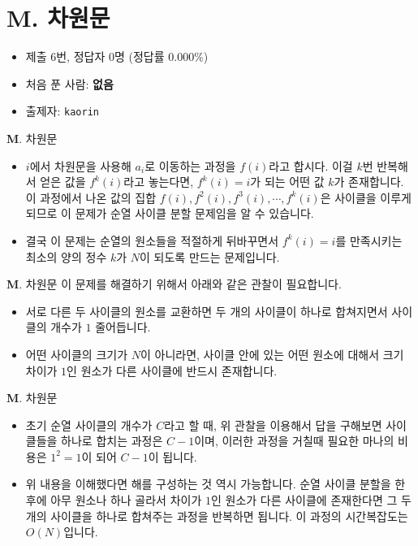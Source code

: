 \section{M. 차원문}

\begin{frame} %
    \begin{itemize}
        \item 제출 6번, 정답자 0명 (정답률 0.000\%)
        \item 처음 푼 사람: \textbf{없음}
        \item 출제자: \texttt{kaorin}
    \end{itemize}
\end{frame}

\begin{frame}{\textbf{M}. 차원문}
    \begin{itemize}
        \item $i$에서 차원문을 사용해 $a_i$로 이동하는 과정을 $f(i)$라고 합시다. 이걸 $k$번 반복해서 얻은 값을 $f^k(i)$라고 놓는다면, $f^k(i)=i$가 되는 어떤 값 $k$가 존재합니다. 이 과정에서 나온 값의 집합 $f(i),f^2(i),f^3(i),\cdots,f^k(i)$은 사이클을 이루게 되므로 이 문제가 순열 사이클 분할 문제임을 알 수 있습니다.
        \item 결국 이 문제는 순열의 원소들을 적절하게 뒤바꾸면서 $f^k(i)=i$를 만족시키는 최소의 양의 정수 $k$가 $N$이 되도록 만드는 문제입니다.  
    \end{itemize}
\end{frame}

\begin{frame}{\textbf{M}. 차원문}
    이 문제를 해결하기 위해서 아래와 같은 관찰이 필요합니다.
    \vspace{16pt}
    \begin{itemize}
        \item 서로 다른 두 사이클의 원소를 교환하면 두 개의 사이클이 하나로 합쳐지면서 사이클의 개수가 $1$ 줄어듭니다.
        \item 어떤 사이클의 크기가 $N$이 아니라면, 사이클 안에 있는 어떤 원소에 대해서 크기 차이가 $1$인 원소가 다른 사이클에 반드시 존재합니다.
    \end{itemize}
\end{frame}

\begin{frame}{\textbf{M}. 차원문}
    \begin{itemize}
        \item 초기 순열 사이클의 개수가 $C$라고 할 때, 위 관찰을 이용해서 답을 구해보면 사이클들을 하나로 합치는 과정은 $C-1$이며, 이러한 과정을 거칠때 필요한 마나의 비용은 $1^2=1$이 되어 $C-1$이 됩니다.
        \item 위 내용을 이해했다면 해를 구성하는 것 역시 가능합니다. 순열 사이클 분할을 한 후에 아무 원소나 하나 골라서 차이가 $1$인 원소가 다른 사이클에 존재한다면 그 두개의 사이클을 하나로 합쳐주는 과정을 반복하면 됩니다. 이 과정의 시간복잡도는 $O(N)$입니다.
    \end{itemize}
\end{frame}

